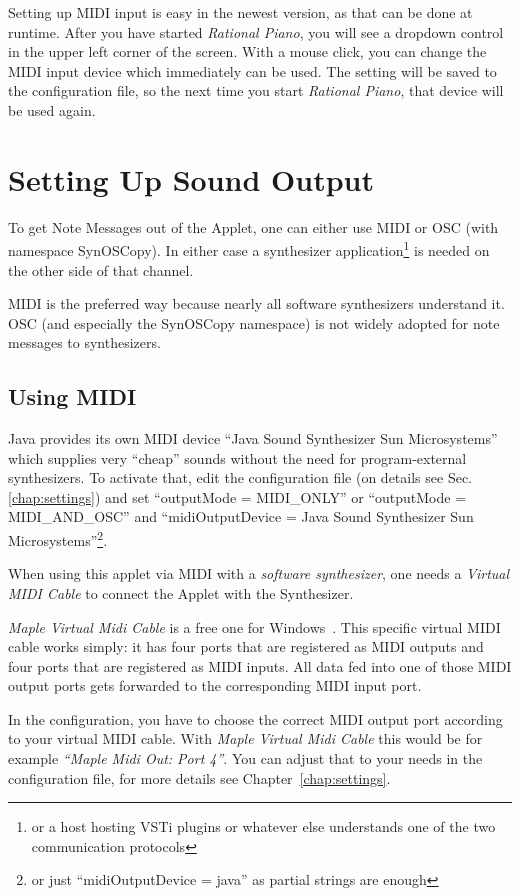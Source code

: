 \documentclass[12pt,a4paper,titlepage,oneside]{report}
\begin{document}
Setting up MIDI input is easy in the newest version, as that can be done at runtime. After you have started \emph{Rational Piano}, you will see a dropdown control in the upper left corner of the screen. With a mouse click, you can change the MIDI input device which immediately can be used. The setting will be saved to the configuration file, so the next time you start \emph{Rational Piano}, that device will be used again.

\section{Setting Up Sound Output}
\label{sec:output}

To get Note Messages out of the Applet, one can either use MIDI or OSC (with namespace SynOSCopy). In either case a synthesizer application\footnote{or a host hosting VSTi plugins or whatever else understands one of the two communication protocols} is needed on the other side of that channel.

MIDI is the preferred way because nearly all software synthesizers understand it. OSC (and especially the SynOSCopy namespace) is not widely adopted for note messages to synthesizers.

\subsection{Using MIDI}

Java provides its own MIDI device ``Java Sound Synthesizer Sun Microsystems'' which supplies very ``cheap'' sounds without the need for program-external synthesizers. To activate that, edit the configuration file (on details see Sec.\ref{chap:settings}) and set ``outputMode = MIDI\_ONLY'' or ``outputMode = MIDI\_AND\_OSC'' and ``midiOutputDevice = Java Sound Synthesizer Sun Microsystems''\footnote{or just ``midiOutputDevice = java'' as partial strings are enough}.

When using this applet via MIDI with a \emph{software synthesizer}, one needs a \emph{Virtual MIDI Cable} to connect the Applet with the Synthesizer.

\emph{Maple Virtual Midi Cable} is a free one for Windows~\cite{bib:maple}. This specific virtual MIDI cable works simply: it has four ports that are registered as MIDI outputs and four ports that are registered as MIDI inputs. All data fed into one of those MIDI output ports gets forwarded to the corresponding MIDI input port.

In the configuration, you have to choose the correct MIDI output port according to your virtual MIDI cable. With \emph{Maple Virtual Midi Cable} this would be for example \emph{``Maple Midi Out: Port 4''}. You can adjust that to your needs in the configuration file, for more details see Chapter~\ref{chap:settings}.
\end{document}
